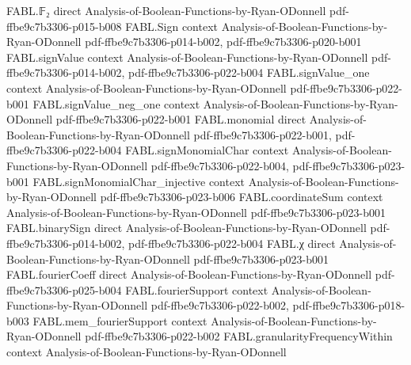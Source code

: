 \begin{theorem}
\label{FABL.affineSubspaceUniformProbability_eq_inversePerpendicularCard}
\leanok
{}
\proofstep
  {FABL.𝔽₂}
  {direct}
  {Analysis-of-Boolean-Functions-by-Ryan-ODonnell}
  {pdf-ffbe9c7b3306-p015-b008}
\proofstep
  {FABL.Sign}
  {context}
  {Analysis-of-Boolean-Functions-by-Ryan-ODonnell}
  {pdf-ffbe9c7b3306-p014-b002,
    pdf-ffbe9c7b3306-p020-b001}
\proofstep
  {FABL.signValue}
  {context}
  {Analysis-of-Boolean-Functions-by-Ryan-ODonnell}
  {pdf-ffbe9c7b3306-p014-b002,
    pdf-ffbe9c7b3306-p022-b004}
\proofstep
  {FABL.signValue_one}
  {context}
  {Analysis-of-Boolean-Functions-by-Ryan-ODonnell}
  {pdf-ffbe9c7b3306-p022-b001}
\proofstep
  {FABL.signValue_neg_one}
  {context}
  {Analysis-of-Boolean-Functions-by-Ryan-ODonnell}
  {pdf-ffbe9c7b3306-p022-b001}
\proofstep
  {FABL.monomial}
  {direct}
  {Analysis-of-Boolean-Functions-by-Ryan-ODonnell}
  {pdf-ffbe9c7b3306-p022-b001,
    pdf-ffbe9c7b3306-p022-b004}
\proofstep
  {FABL.signMonomialChar}
  {context}
  {Analysis-of-Boolean-Functions-by-Ryan-ODonnell}
  {pdf-ffbe9c7b3306-p022-b004,
    pdf-ffbe9c7b3306-p023-b001}
\proofstep
  {FABL.signMonomialChar_injective}
  {context}
  {Analysis-of-Boolean-Functions-by-Ryan-ODonnell}
  {pdf-ffbe9c7b3306-p023-b006}
\proofstep
  {FABL.coordinateSum}
  {context}
  {Analysis-of-Boolean-Functions-by-Ryan-ODonnell}
  {pdf-ffbe9c7b3306-p023-b001}
\proofstep
  {FABL.binarySign}
  {direct}
  {Analysis-of-Boolean-Functions-by-Ryan-ODonnell}
  {pdf-ffbe9c7b3306-p014-b002,
    pdf-ffbe9c7b3306-p022-b004}
\proofstep
  {FABL.χ}
  {direct}
  {Analysis-of-Boolean-Functions-by-Ryan-ODonnell}
  {pdf-ffbe9c7b3306-p023-b001}
\proofstep
  {FABL.fourierCoeff}
  {direct}
  {Analysis-of-Boolean-Functions-by-Ryan-ODonnell}
  {pdf-ffbe9c7b3306-p025-b004}
\proofstep
  {FABL.fourierSupport}
  {context}
  {Analysis-of-Boolean-Functions-by-Ryan-ODonnell}
  {pdf-ffbe9c7b3306-p022-b002,
    pdf-ffbe9c7b3306-p018-b003}
\proofstep
  {FABL.mem_fourierSupport}
  {context}
  {Analysis-of-Boolean-Functions-by-Ryan-ODonnell}
  {pdf-ffbe9c7b3306-p022-b002}
\proofstep
  {FABL.granularityFrequencyWithin}
  {context}
  {Analysis-of-Boolean-Functions-by-Ryan-ODonnell}

\end{theorem}

